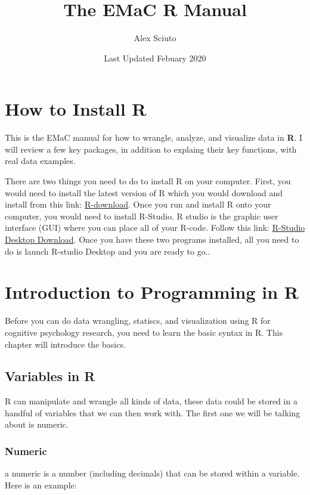 \documentclass[]{book}
\title{The EMaC R Manual}
\author{Alex Sciuto}
\date{Last Updated Febuary 2020}
\begin{document}
\maketitle

{
\setcounter{tocdepth}{1}
\tableofcontents
}
\chapter{How to Install R}\label{download}

This is the EMaC manual for how to wrangle, analyze, and visualize data
in \textbf{R}. I will review a few key packages, in addition to explaing
their key functions, with real data examples.

There are two things you need to do to install R on your computer.
First, you would need to install the latest version of R which you would
download and install from this link:
\href{https://cloud.r-project.org/}{R-download}. Once you run and
install R onto your computer, you would need to install R-Studio. R
studio is the graphic user interface (GUI) where you can place all of
your R-code. Follow this link:
\href{https://rstudio.com/products/rstudio/download/}{R-Studio Desktop
Download}. Once you have these two programs installed, all you need to
do is launch R-studio Desktop and you are ready to go..

\chapter{Introduction to Programming in R}\label{intro}

Before you can do data wrangling, statiscs, and visualization using R
for cognitive psychology research, you need to learn the basic syntax in
R. This chapter will introduce the basics.

\section{Variables in R}\label{variables-in-r}

R can manipulate and wrangle all kinds of data, these data could be
stored in a handful of variables that we can then work with. The first
one we will be talking about is numeric.

\subsection{Numeric}\label{numeric}

a numeric is a number (including decimals) that can be stored within a
variable. Here is an example:
\end{document}
